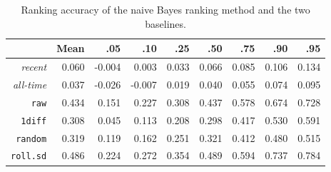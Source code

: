 \documentclass{article}\usepackage[]{graphicx}\usepackage[]{color}
\newcommand{\naive}{\textit{recent}}
\newcommand{\default}{\textit{all-time}}
\newcommand{\raw}{\texttt{raw}}
\newcommand{\diff}{\texttt{1diff}}
\newcommand{\random}{\texttt{random}}
\newcommand{\rollsd}{\texttt{roll.sd}}
\newcommand{\ra}[1]{\renewcommand{\arraystretch}{#1}}
\begin{document}
\begin{table}[ht]

\ra{1.2}
\caption{Ranking accuracy of the naive Bayes ranking method and the two baselines.}
\label{stat:acc}
\begin{center}
\begin{tabular}{rrrrrrrrr}
  \toprule
 & Mean & .05 & .10 & .25 & .50 & .75 & .90 & .95 \\ 
\midrule
\naive{} & 0.060 & -0.004 & 0.003 & 0.033 & 0.066 & 0.085 & 0.106 & 0.134 \\ 
  \default{} & 0.037 & -0.026 & -0.007 & 0.019 & 0.040 & 0.055 & 0.074 & 0.095 \\ 
  \raw{} & 0.434 & 0.151 & 0.227 & 0.308 & 0.437 & 0.578 & 0.674 & 0.728 \\ 
  \diff{} & 0.308 & 0.045 & 0.113 & 0.208 & 0.298 & 0.417 & 0.530 & 0.591 \\ 
  \random{} & 0.319 & 0.119 & 0.162 & 0.251 & 0.321 & 0.412 & 0.480 & 0.515 \\ 
  \rollsd{} & 0.486 & 0.224 & 0.272 & 0.354 & 0.489 & 0.594 & 0.737 & 0.784 \\ 
   \bottomrule
\end{tabular}
\end{center}
\end{table}
\end{document}
